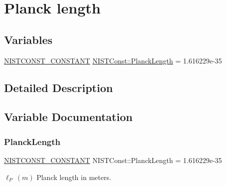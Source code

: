 \hypertarget{group___n_i_s_t_const-_planck_length}{}\section{Planck length}
\label{group___n_i_s_t_const-_planck_length}
\subsection*{Variables}
\begin{DoxyCompactItemize}
\item 
\mbox{\hyperlink{_n_i_s_t_const_8hpp_a2b0fc1d7452373f816175dd86ce26729}{N\+I\+S\+T\+C\+O\+N\+S\+T\+\_\+\+C\+O\+N\+S\+T\+A\+NT}} \mbox{\hyperlink{group___n_i_s_t_const-_planck_length_ga2e9817f37b39c109d5a1e69596e467e7}{N\+I\+S\+T\+Const\+::\+Planck\+Length}} = 1.\+616229e-\/35
\end{DoxyCompactItemize}


\subsection{Detailed Description}


\subsection{Variable Documentation}
\mbox{\label{group___n_i_s_t_const-_planck_length_ga2e9817f37b39c109d5a1e69596e467e7}} 
\subsubsection{\texorpdfstring{Planck\+Length}{PlanckLength}}
{\footnotesize\ttfamily \mbox{\hyperlink{_n_i_s_t_const_8hpp_a2b0fc1d7452373f816175dd86ce26729}{N\+I\+S\+T\+C\+O\+N\+S\+T\+\_\+\+C\+O\+N\+S\+T\+A\+NT}} N\+I\+S\+T\+Const\+::\+Planck\+Length = 1.\+616229e-\/35}

$\ell_P \ (m)$ Planck length in meters. 